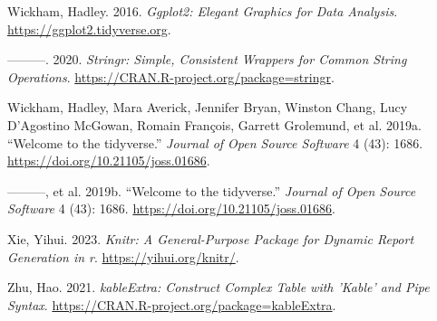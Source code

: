 \documentclass[
  letterpaper,
  DIV=11,
  numbers=noendperiod]{scrartcl}
\newlength{\cslhangindent}
\newlength{\cslentryspacingunit} %
\newenvironment{CSLReferences}[2] %
 {%
  \setlength{\parindent}{0pt}
  \ifodd #1
  \let\oldpar\par
  \def\par{\hangindent=\cslhangindent\oldpar}
  \fi
  \setlength{\parskip}{#2\cslentryspacingunit}
 }%
 {}
\begin{document}
\begin{CSLReferences}{1}{0}
\leavevmode{}%
Wickham, Hadley. 2016. \emph{Ggplot2: Elegant Graphics for Data
Analysis}. \url{https://ggplot2.tidyverse.org}.

\leavevmode{}%
---------. 2020. \emph{Stringr: Simple, Consistent Wrappers for Common
String Operations}. \url{https://CRAN.R-project.org/package=stringr}.

\leavevmode{}%
Wickham, Hadley, Mara Averick, Jennifer Bryan, Winston Chang, Lucy
D'Agostino McGowan, Romain François, Garrett Grolemund, et al. 2019a.
{``Welcome to the {tidyverse}.''} \emph{Journal of Open Source Software}
4 (43): 1686. \url{https://doi.org/10.21105/joss.01686}.

\leavevmode{}%
---------, et al. 2019b. {``Welcome to the {tidyverse}.''} \emph{Journal
of Open Source Software} 4 (43): 1686.
\url{https://doi.org/10.21105/joss.01686}.

\leavevmode{}%
Xie, Yihui. 2023. \emph{Knitr: A General-Purpose Package for Dynamic
Report Generation in r}. \url{https://yihui.org/knitr/}.

\leavevmode{}%
Zhu, Hao. 2021. \emph{kableExtra: Construct Complex Table with 'Kable'
and Pipe Syntax}. \url{https://CRAN.R-project.org/package=kableExtra}.

\end{CSLReferences}
\end{document}

